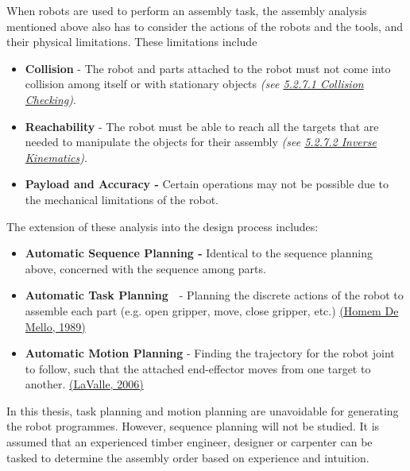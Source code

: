 \documentclass[11pt]{book}
\begin{document}
When robots are used to perform an assembly task, the assembly analysis mentioned above also has to consider the actions of the robots and the tools, and their physical limitations. These limitations include

\begin{itemize}
	\item \begin{flushleft}
\textbf{Collision }- The robot and parts attached to the robot must not come into collision among itself or with stationary objects \textit{(see \uline{5.2.7.1 Collision Checking})}.
\end{flushleft}


\end{itemize}
\begin{itemize}
	\item \textbf{Reachability }- The robot must be able to reach all the targets that are needed to manipulate the objects for their assembly \textit{(see \uline{5.2.7.2 Inverse Kinematics})}.

	\item \textbf{Payload and Accuracy - }Certain operations may not be possible due to the mechanical limitations of the robot.

\end{itemize}
The extension of these analysis into the design process includes:

\begin{itemize}
	\item \textbf{Automatic Sequence Planning - }Identical to the sequence planning above, concerned with the sequence among parts.

	\item \textbf{Automatic Task Planning}\ \ - Planning the discrete actions of the robot to assemble each part (e.g. open gripper, move, close gripper, etc.) \href{https://www.zotero.org/google-docs/?YRv70u}{(Homem De Mello, 1989)}

	\item \textbf{Automatic Motion Planning} - Finding the trajectory for the robot joint to follow, such that the attached end-effector moves from one target to another.  \href{https://www.zotero.org/google-docs/?dDVZq8}{(LaValle, 2006)}

\end{itemize}
\begin{flushleft}
In this thesis, task planning and motion planning are unavoidable for generating the robot programmes. However, sequence planning will not be studied. It is assumed that an experienced timber engineer, designer or carpenter can be tasked to determine the assembly order based on experience and intuition.
\end{flushleft}
\end{document}
